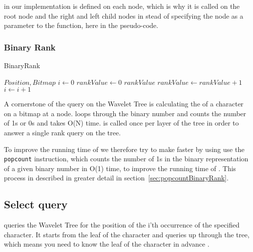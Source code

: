 \noindent {} in our implementation is defined on each node, which is why it is called on the root node and the right and left child nodes in stead of specifying the node as a parameter to the  function, here in the pseudo-code.

\subsubsection{Binary Rank} 
\label{sec:TheoryBinaryRank}

\begin{algorithm}
\caption{BinaryRank}
\label{alg:binaryrank}
\begin{algorithmic}
 {$Position, Bitmap$}
\State $i \gets 0$
\State $rankValue \gets 0$
\State \Return $rankValue$
\EndIf
{}
\State $rankValue \gets rankValue + 1$
\EndIf
\State $i \gets i + 1$
\EndFor
\EndFunction
\end{algorithmic}
\end{algorithm}
A cornerstone of the  query on the Wavelet Tree is calculating the  of a character on a bitmap at a node.
 loops through the binary number and counts the number of 1s or 0s and takes O(N) time.  is called once per layer of the tree in order to answer a single rank query on the tree. 

To improve the running time of  we therefore try to make  faster by using use the \texttt{popcount} instruction, which counts the number of 1s in the binary representation of a given binary number in O(1) time, to improve the running time of . 
This process in described in greater detail in section~\ref{sec:popcountBinaryRank}.

\subsection{Select query}
 queries the Wavelet Tree for the position of the i'th occurrence of the specified character.
It starts from the leaf of the character and queries up through the tree, which means you need to know the leaf of the character in advance \citep[Section 2.2]{Claude08practicalrankselect}. 


